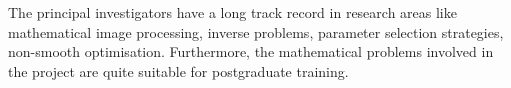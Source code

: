 \documentclass[enabledeprecatedfontcommands,cleardoublepage=empty,headsepline,twoside,11pt,DIV=15,BCOR=12mm,final]{scrartcl}
\begin{document}


The principal investigators %
have a long track record in research areas like mathematical image processing, inverse problems, parameter selection strategies, non-smooth optimisation.
Furthermore, the mathematical problems involved in the project are quite suitable for postgraduate training.




\end{document}
